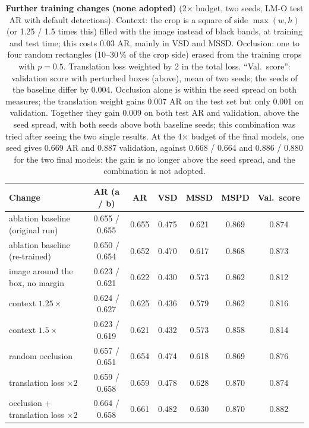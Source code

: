 \begin{table}[h]
  \centering
  \setlength{\tabcolsep}{3.5pt}
  \footnotesize
  \begin{tabular}{lcccccc}
    \toprule
    Change & AR (a / b) & AR & VSD & MSSD & MSPD & Val.\ score \\
    \midrule
    ablation baseline (original run) & 0.655 / 0.655 & 0.655 & 0.475 & 0.621 & 0.869 & 0.874 \\
    ablation baseline (re-trained) & 0.650 / 0.654 & 0.652 & 0.470 & 0.617 & 0.868 & 0.873 \\
    \midrule
    image around the box, no margin & 0.623 / 0.621 & 0.622 & 0.430 & 0.573 & 0.862 & 0.812 \\
    context $1.25\times$ & 0.624 / 0.627 & 0.625 & 0.436 & 0.579 & 0.862 & 0.816 \\
    context $1.5\times$ & 0.623 / 0.619 & 0.621 & 0.432 & 0.573 & 0.858 & 0.814 \\
    random occlusion & 0.657 / 0.651 & 0.654 & 0.474 & 0.618 & 0.869 & 0.876 \\
    translation loss $\times 2$ & 0.659 / 0.658 & 0.659 & 0.478 & 0.628 & 0.870 & 0.874 \\
    occlusion + translation loss $\times 2$ & 0.664 / 0.658 & 0.661 & 0.482 & 0.630 & 0.870 & 0.882 \\
    \bottomrule
  \end{tabular}
  \caption{\textbf{Further training changes (none adopted)} (2$\times$ budget, two seeds, LM-O test AR with
  default detections). Context: the crop is a square of side $\max(w, h)$ (or 1.25 / 1.5 times
  this) filled with the image instead of black bands, at training and test time; this costs
  0.03 AR, mainly in VSD and MSSD. Occlusion: one to four random rectangles (10--30\,\% of the
  crop side) erased from the training crops with $p = 0.5$. Translation loss weighted by 2 in the
  total loss. ``Val.\ score'': validation score with perturbed boxes (above), mean of two seeds;
  the seeds of the baseline differ by 0.004. Occlusion alone is within the seed spread on both
  measures; the translation weight gains 0.007 AR on the test set but only 0.001 on validation.
  Together they gain 0.009 on both test AR and validation, above the seed spread, with both
  seeds above both baseline seeds; this combination was tried after seeing the two single
  results. At the 4$\times$ budget of the final models, one seed gives 0.669 AR and 0.887
  validation, against 0.668 / 0.664 and 0.886 / 0.880 for the two final models: the gain is no
  longer above the seed spread, and the combination is not adopted.}
  \label{tab:supp:m11}
\end{table}

